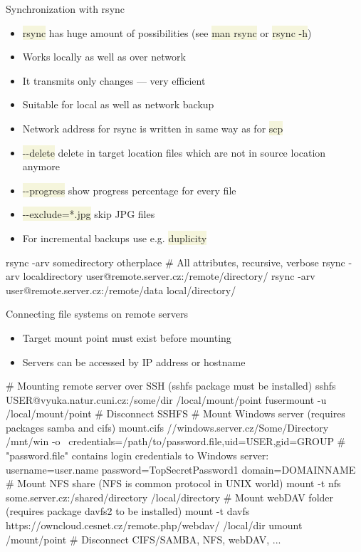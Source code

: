 \documentclass[compress, xelatex, 11pt, xcolor=svgnames, aspectratio=169,
	hyperref={
		bookmarks=true,
		unicode=true,
		colorlinks=true,
		pdftitle={Linux, command line and MetaCentrum},
		plainpages=false,
		pdfauthor={Vojtech Zeisek},
		pdfsubject={Course about use of Linux command line, writing shell scripts and using MetaCentrum of CESNET},
		pdfcreator={XeLaTeX},
		pdfkeywords={Linux, GNU, BASH, shell, command line, MetaCentrum},
		linkcolor=DarkRed, %
		anchorcolor=DarkBlue, %
		citecolor=Indigo, %
		filecolor=NavyBlue, %
		menucolor=DarkMagenta, %
		urlcolor=DarkBlue, %
		},
	url={hyphens, lowtilde} %
	]{beamer}
\renewcommand{\texttt}[1]{\colorbox{Beige}{{\ttfamily #1}}}
\begin{document}
\begin{frame}[fragile]{Synchronization with rsync}
	\begin{itemize}
		\item \texttt{rsync} has huge amount of possibilities (see \texttt{man rsync} or \texttt{rsync -h})
		\item Works locally as well as over network
		\item It transmits only changes --- very efficient
		\item Suitable for local as well as network backup
		\item Network address for rsync is written in same way as for \texttt{scp}
		\item \texttt{-{-}delete} delete in target location files which are not in source location anymore
		\item \texttt{-{-}progress} show progress percentage for every file
		\item \texttt{-{-}exclude=*.jpg} skip JPG files
		\item For incremental backups use e.g. \texttt{duplicity}
	\end{itemize}
	\vfill
	\begin{bashcode}
    rsync -arv somedirectory otherplace # All attributes, recursive, verbose
    rsync -arv localdirectory user@remote.server.cz:/remote/directory/
    rsync -arv user@remote.server.cz:/remote/data local/directory/
	\end{bashcode}
\end{frame}

\begin{frame}[fragile]{Connecting file systems on remote servers}
	\label{netfs}
	\begin{itemize}
		\item Target mount point must exist before mounting
		\item Servers can be accessed by IP address or hostname
	\end{itemize}
	\vfill
	\begin{bashcode}
    # Mounting remote server over SSH (sshfs package must be installed)
    sshfs USER@vyuka.natur.cuni.cz:/some/dir /local/mount/point
    fusermount -u /local/mount/point # Disconnect SSHFS
    # Mount Windows server (requires packages samba and cifs)
    mount.cifs //windows.server.cz/Some/Directory /mnt/win -o \
      credentials=/path/to/password.file,uid=USER,gid=GROUP
    # "password.file" contains login credentials to Windows server:
    username=user.name
    password=TopSecretPassword1
    domain=DOMAINNAME
    # Mount NFS share (NFS is common protocol in UNIX world)
    mount -t nfs some.server.cz:/shared/directory /local/directory
    # Mount webDAV folder (requires package davfs2 to be installed)
    mount -t davfs https://owncloud.cesnet.cz/remote.php/webdav/ /local/dir
    umount /mount/point # Disconnect CIFS/SAMBA, NFS, webDAV, ...
	\end{bashcode}
\end{frame}
\end{document}
